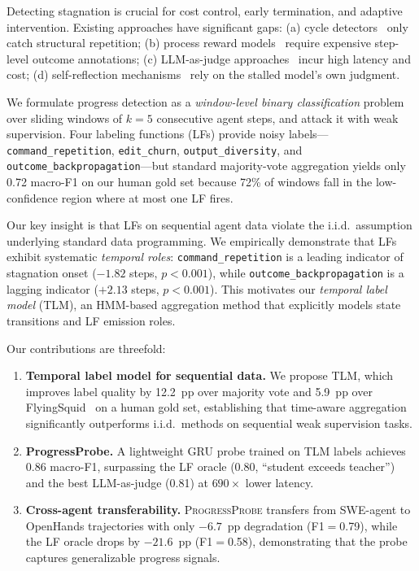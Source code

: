 \documentclass[11pt,a4paper]{article}
\newcommand{\ours}{\textsc{ProgressProbe}}
\newcommand{\tlm}{\textsc{TLM}}
\begin{document}
Detecting stagnation is crucial for cost control, early termination, and adaptive intervention. Existing approaches have significant gaps: (a) cycle detectors~\cite{zhuge2024cdcs,zhang2024specra} only catch structural repetition; (b) process reward models~\cite{lightman2023lets,wang2024mathshepherd} require expensive step-level outcome annotations; (c) LLM-as-judge approaches~\cite{zheng2024judging} incur high latency and cost; (d) self-reflection mechanisms~\cite{shinn2023reflexion,yao2024tree} rely on the stalled model's own judgment.

We formulate progress detection as a \emph{window-level binary classification} problem over sliding windows of $k{=}5$ consecutive agent steps, and attack it with weak supervision. Four labeling functions (LFs) provide noisy labels---\texttt{command\_repetition}, \texttt{edit\_churn}, \texttt{output\_diversity}, and \texttt{outcome\_backpropagation}---but standard majority-vote aggregation yields only 0.72 macro-F1 on our human gold set because 72\% of windows fall in the low-confidence region where at most one LF fires.

Our key insight is that LFs on sequential agent data violate the i.i.d.\ assumption underlying standard data programming. We empirically demonstrate that LFs exhibit systematic \emph{temporal roles}: \texttt{command\_repetition} is a leading indicator of stagnation onset ($-1.82$ steps, $p{<}0.001$), while \texttt{outcome\_backpropagation} is a lagging indicator ($+2.13$ steps, $p{<}0.001$). This motivates our \emph{temporal label model} (\tlm{}), an HMM-based aggregation method that explicitly models state transitions and LF emission roles.

Our contributions are threefold:
\begin{enumerate}[nosep,leftmargin=*]
\item \textbf{Temporal label model for sequential data.} We propose \tlm{}, which improves label quality by 12.2~pp over majority vote and 5.9~pp over FlyingSquid~\cite{fu2020fast} on a human gold set, establishing that time-aware aggregation significantly outperforms i.i.d.\ methods on sequential weak supervision tasks.
\item \textbf{ProgressProbe.} A lightweight GRU probe trained on \tlm{} labels achieves 0.86 macro-F1, surpassing the LF oracle (0.80, ``student exceeds teacher'') and the best LLM-as-judge (0.81) at $690\times$ lower latency.
\item \textbf{Cross-agent transferability.} \ours{} transfers from SWE-agent to OpenHands trajectories with only $-6.7$~pp degradation (F1$=$0.79), while the LF oracle drops by $-21.6$~pp (F1$=$0.58), demonstrating that the probe captures generalizable progress signals.
\end{enumerate}
\end{document}

